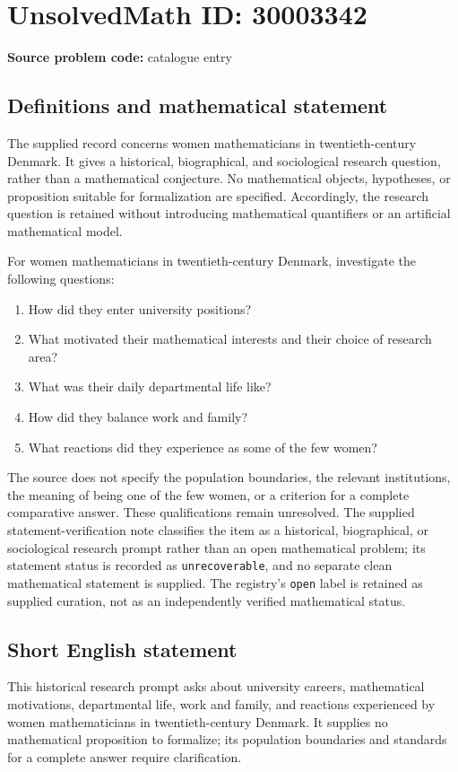 \documentclass[11pt]{article}
\begin{document}
\section*{UnsolvedMath ID: 30003342}
\textbf{Source problem code:} catalogue entry
\subsection{Definitions and mathematical statement}
The supplied record concerns women mathematicians in twentieth-century Denmark. It gives a historical, biographical, and sociological research question, rather than a mathematical conjecture. No mathematical objects, hypotheses, or proposition suitable for formalization are specified. Accordingly, the research question is retained without introducing mathematical quantifiers or an artificial mathematical model.

For women mathematicians in twentieth-century Denmark, investigate the following questions:
\begin{enumerate}
\item How did they enter university positions?
\item What motivated their mathematical interests and their choice of research area?
\item What was their daily departmental life like?
\item How did they balance work and family?
\item What reactions did they experience as some of the few women?
\end{enumerate}

The source does not specify the population boundaries, the relevant institutions, the meaning of being one of the few women, or a criterion for a complete comparative answer. These qualifications remain unresolved. The supplied statement-verification note classifies the item as a historical, biographical, or sociological research prompt rather than an open mathematical problem; its statement status is recorded as \texttt{unrecoverable}, and no separate clean mathematical statement is supplied. The registry's \texttt{open} label is retained as supplied curation, not as an independently verified mathematical status.
\subsection{Short English statement}
This historical research prompt asks about university careers, mathematical motivations, departmental life, work and family, and reactions experienced by women mathematicians in twentieth-century Denmark. It supplies no mathematical proposition to formalize; its population boundaries and standards for a complete answer require clarification.
\end{document}

